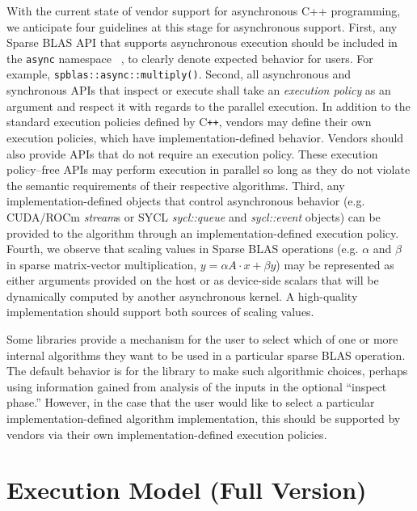 \documentclass{article}
\newcommand{\cplusplus}{C\texttt{++}\xspace}
\begin{document}
With the current state of vendor support for asynchronous C++ programming, we anticipate four guidelines at this stage for asynchronous support.
First, any Sparse BLAS API that supports asynchronous execution should be included in the \verb|async| namespace ~\cite{p3300r0}, to clearly denote expected behavior for users. For example, \verb|spblas::async::multiply()|.
Second, all asynchronous and synchronous APIs that inspect or execute shall take an \textit{execution policy} as an argument and respect it with regards to the parallel execution. In addition to the standard execution policies defined by \cplusplus, vendors may define their own execution policies, which have implementation-defined behavior. Vendors should also provide APIs that do not require an execution policy.  These execution policy--free APIs may perform execution in parallel so long as they do not violate the semantic requirements of their respective algorithms.
Third, any implementation-defined objects that control asynchronous behavior (e.g. CUDA/ROCm \textit{stream}s or SYCL \textit{sycl::queue} and \textit{sycl::event} objects) can be provided to the algorithm through an implementation-defined execution policy.
Fourth, we observe that scaling values in Sparse BLAS operations (e.g. $\alpha$ and $\beta$ in sparse matrix-vector multiplication, $y = \alpha A\cdot x + \beta y$) may be represented as either arguments provided on the host or as device-side scalars that will be dynamically computed by another asynchronous kernel.  A high-quality implementation should support both sources of scaling values.

Some libraries provide a mechanism for the user to select which of one or more internal algorithms they want to be used in a particular sparse BLAS operation. The default behavior is for the library to make such algorithmic choices, perhaps using information gained from analysis of the inputs in the optional ``inspect phase.'' However, in the case that the user would like to select a particular implementation-defined algorithm implementation, this should be supported by vendors via their own implementation-defined execution policies.



\iffalse
\section{Execution Model (Full Version)}
\label{sec:async_api}
\end{document}
